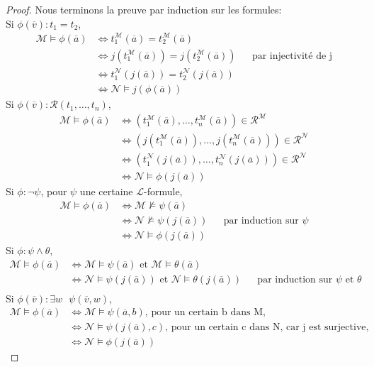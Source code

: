 \begin{proof}
Nous terminons la preuve par induction sur les formules:\\[0.5cm]
Si $\phi(\overline{v}): t_1 = t_2$,
\begin{align*}
\mathcal{M} \models \phi(\overline{a}) &\iff t_1^{\mathcal{M}}(\overline{a}) = t_2^{\mathcal{M}}(\overline{a})\\
&\iff j(t_1^{\mathcal{M}}(\overline{a})) = j(t_2^{\mathcal{M}}(\overline{a})) && \text{par injectivité de j}\\
&\iff t_1^{\mathcal{N}}(j(\overline{a})) = t_2^{\mathcal{N}}(j(\overline{a}))\\
&\iff \mathcal{N} \models j(\phi(\overline{a}))
\end{align*}
Si $\phi(\overline{v}): \mathcal{R}(t_1,\dots,t_n)$,
\begin{align*}
\mathcal{M} \models \phi(\overline{a}) &\iff (t_1^{\mathcal{M}}(\overline{a}),\dots,t_n^{\mathcal{M}}(\overline{a})) \in \mathcal{R}^{\mathcal{M}}\\
&\iff (j(t_1^{\mathcal{M}}(\overline{a})),\dots,j(t_n^{\mathcal{M}}(\overline{a}))) \in \mathcal{R}^{\mathcal{N}}\\
&\iff (t_1^{\mathcal{N}}(j(\overline{a})),\dots,t_n^{\mathcal{N}}(j(\overline{a}))) \in \mathcal{R}^{\mathcal{N}}\\
&\iff \mathcal{N} \models \phi(j(\overline{a}))
\end{align*}
Si $\phi: \neg\psi$, pour $\psi$ une certaine $\mathcal{L}$-formule,
\begin{align*}
\mathcal{M} \models \phi(\overline{a}) &\iff \mathcal{M} \not\models \psi(\overline{a})\\
&\iff \mathcal{N} \not\models \psi(j(\overline{a})) && \text{par induction sur } \psi\\
&\iff \mathcal{N} \models \phi(j(\overline{a}))
\end{align*}
Si $\phi: \psi \wedge \theta$,
\begin{align*}
\mathcal{M} \models \phi(\overline{a}) &\iff \mathcal{M} \models \psi(\overline{a}) \text{ et } \mathcal{M} \models \theta(\overline{a})\\
&\iff \mathcal{N} \models \psi(j(\overline{a})) \text{ et } \mathcal{N} \models \theta(j(\overline{a})) && \text{par induction sur }\psi\text{ et }\theta\\
\end{align*}
Si $\phi(\overline{v}): \exists w \text{ } \psi(\overline{v},w)$,
\begin{align*}
\mathcal{M} \models \phi(\overline{a}) &\iff \mathcal{M} \models \psi(\overline{a},b) \text{, pour un certain b dans M,}\\
&\iff \mathcal{N} \models \psi(j(\overline{a}),c) \text{, pour un certain c dans N,  car j est surjective,}\\
&\iff \mathcal{N} \models \phi(j(\overline{a}))
\end{align*}
\end{proof}

